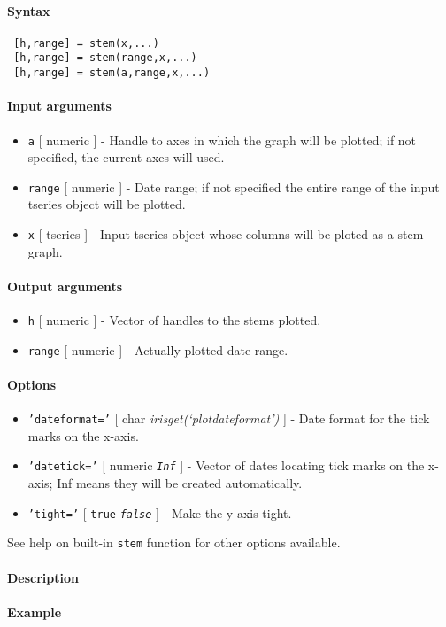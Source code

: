 


	\paragraph{Syntax}
 
 \begin{verbatim}
 [h,range] = stem(x,...)
 [h,range] = stem(range,x,...)
 [h,range] = stem(a,range,x,...)
 \end{verbatim}
 
 \paragraph{Input arguments}
 
 \begin{itemize}
 \item
   \texttt{a} {[} numeric {]} - Handle to axes in which the graph will be
   plotted; if not specified, the current axes will used.
 \item
   \texttt{range} {[} numeric {]} - Date range; if not specified the
   entire range of the input tseries object will be plotted.
 \item
   \texttt{x} {[} tseries {]} - Input tseries object whose columns will
   be ploted as a stem graph.
 \end{itemize}
 
 \paragraph{Output arguments}
 
 \begin{itemize}
 \item
   \texttt{h} {[} numeric {]} - Vector of handles to the stems plotted.
 \item
   \texttt{range} {[} numeric {]} - Actually plotted date range.
 \end{itemize}
 
 \paragraph{Options}
 
 \begin{itemize}
 \item
   \texttt{'dateformat='} {[} char \textbar{}
   \emph{irisget(`plotdateformat')} {]} - Date format for the tick marks
   on the x-axis.
 \item
   \texttt{'datetick='} {[} numeric \textbar{} \emph{\texttt{Inf}} {]} -
   Vector of dates locating tick marks on the x-axis; Inf means they will
   be created automatically.
 \item
   \texttt{'tight='} {[} \texttt{true} \textbar{} \emph{\texttt{false}}
   {]} - Make the y-axis tight.
 \end{itemize}
 
 See help on built-in \texttt{stem} function for other options available.
 
 \paragraph{Description}
 
 \paragraph{Example}


